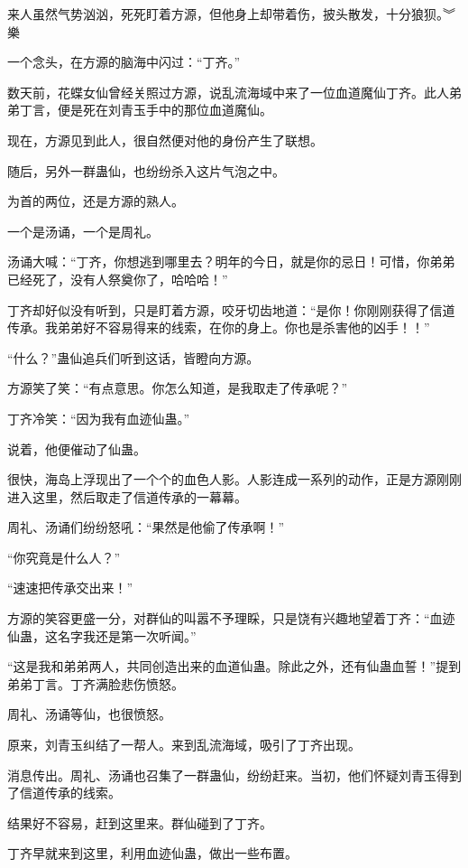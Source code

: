 
\begin{this_body}

来人虽然气势汹汹，死死盯着方源，但他身上却带着伤，披头散发，十分狼狈。︾樂

一个念头，在方源的脑海中闪过：“丁齐。”

数天前，花蝶女仙曾经关照过方源，说乱流海域中来了一位血道魔仙丁齐。此人弟弟丁言，便是死在刘青玉手中的那位血道魔仙。

现在，方源见到此人，很自然便对他的身份产生了联想。

随后，另外一群蛊仙，也纷纷杀入这片气泡之中。

为首的两位，还是方源的熟人。

一个是汤诵，一个是周礼。

汤诵大喊：“丁齐，你想逃到哪里去？明年的今日，就是你的忌日！可惜，你弟弟已经死了，没有人祭奠你了，哈哈哈！”

丁齐却好似没有听到，只是盯着方源，咬牙切齿地道：“是你！你刚刚获得了信道传承。我弟弟好不容易得来的线索，在你的身上。你也是杀害他的凶手！！”

“什么？”蛊仙追兵们听到这话，皆瞪向方源。

方源笑了笑：“有点意思。你怎么知道，是我取走了传承呢？”

丁齐冷笑：“因为我有血迹仙蛊。”

说着，他便催动了仙蛊。

很快，海岛上浮现出了一个个的血色人影。人影连成一系列的动作，正是方源刚刚进入这里，然后取走了信道传承的一幕幕。

周礼、汤诵们纷纷怒吼：“果然是他偷了传承啊！”

“你究竟是什么人？”

“速速把传承交出来！”

方源的笑容更盛一分，对群仙的叫嚣不予理睬，只是饶有兴趣地望着丁齐：“血迹仙蛊，这名字我还是第一次听闻。”

“这是我和弟弟两人，共同创造出来的血道仙蛊。除此之外，还有仙蛊血誓！”提到弟弟丁言。丁齐满脸悲伤愤怒。

周礼、汤诵等仙，也很愤怒。

原来，刘青玉纠结了一帮人。来到乱流海域，吸引了丁齐出现。

消息传出。周礼、汤诵也召集了一群蛊仙，纷纷赶来。当初，他们怀疑刘青玉得到了信道传承的线索。

结果好不容易，赶到这里来。群仙碰到了丁齐。

丁齐早就来到这里，利用血迹仙蛊，做出一些布置。


\end{this_body}
